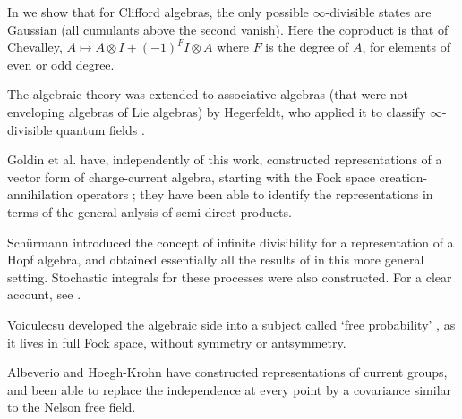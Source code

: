 In \cite{Mathon2} we show that for Clifford algebras, the only possible
$\infty$-divisible states are
Gaussian (all cumulants above the second vanish). Here 
the coproduct is that of Chevalley,
$A\mapsto A\otimes I+(-1)^FI\otimes A$ where $F$ is the
degree of $A$, for elements of even or odd degree.

The algebraic theory
was extended to associative algebras (that were not enveloping
algebras of Lie algebras) by Hegerfeldt, who applied it to classify
$\infty$-divisible quantum fields \cite{Hegerfeldt2}.

Goldin et al. have, independently of this work, constructed
representations of a vector form of charge-current algebra, starting
with the Fock space creation-annihilation operators \cite{Goldin}; they
have been able to identify the representations in terms of the general
anlysis of semi-direct products.

Sch\"{u}rmann \cite{Schurmann} introduced the concept of infinite
divisibility for a representation of a Hopf algebra, and obtained 
essentially all the results of \cite{RFS4,Mathon,Mathon2} in this more
general setting.
Stochastic integrals for these processes were also constructed.
For a clear account, see \cite{Meyer}.

 
Voiculecsu developed the algebraic side into a subject called `free
probability' \cite{Voiculescu}, as it lives in full Fock space, without
symmetry or antsymmetry.


Albeverio and Hoegh-Krohn \cite{Albeverio} have constructed
representations of current 
groups, and been able to replace the independence at every point by
a covariance similar to the Nelson free field.

